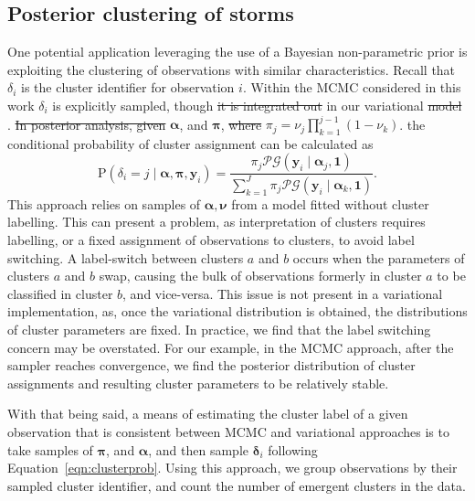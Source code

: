 \subsection{Posterior clustering of storms}
One potential application leveraging the use of a Bayesian non-parametric prior is 
    exploiting the clustering of observations with similar characteristics.  
    Recall that $\delta_i$ is the cluster identifier for observation $i$. Within the 
    MCMC considered in this work $\delta_i$ is explicitly sampled, though \st{it is integrated out}
    in our variational \st{model} . \st{In posterior analysis, given} 
    $\bm{\alpha}$, and $\bm{\pi}$, \st{where}  
    $\pi_j = \nu_j\prod_{k = 1}^{j-1}(1 - \nu_k)$.  the conditional 
    probability of cluster  assignment can be calculated as
    \begin{equation}
        \label{eqn:clusterprob}
        \text{P}\left(\delta_i = j\mid\bm{\alpha},\bm{\pi},\bm{y}_i\right) 
            = \frac{\pi_j\mathcal{PG}(\bm{y}_i\mid\bm{\alpha}_j,\bm{1})}{
            \sum_{k = 1}^J \pi_j\mathcal{PG}(\bm{y}_i\mid\bm{\alpha}_k,\bm{1})}.
    \end{equation}
    This approach relies on samples of $\bm{\alpha},\bm{\nu}$ from a model fitted without 
    cluster labelling. This can present a problem, as interpretation of clusters requires 
    labelling, or a fixed assignment of observations to clusters, to avoid label switching.
    A label-switch between clusters $a$ and $b$ occurs when the parameters of clusters 
    $a$ and $b$ swap, causing the bulk of observations formerly in cluster $a$ to be 
    classified in cluster $b$, and vice-versa. This issue is not present in a variational 
    implementation, as, once the variational distribution is obtained, the distributions 
    of cluster parameters are fixed.  In practice, we find that the label switching 
    concern may be overstated.  For our example, in the MCMC approach,
    after the sampler reaches convergence, we find the posterior distribution of 
    cluster assignments and resulting cluster parameters to be relatively stable.

With that being said, a means of estimating the cluster label of a given observation that 
    is consistent between MCMC and variational approaches is to take samples of $\bm{\pi}$, 
    and $\bm{\alpha}$, and then sample $\bm{\delta}_i$ following Equation~\eqref{eqn:clusterprob}.  
    Using this approach, we group observations by their sampled cluster identifier, and count 
    the number of emergent clusters in the data.

